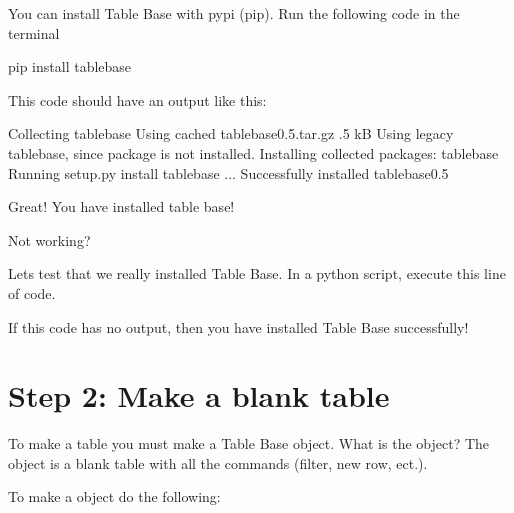 \documentclass[letterpaper,10pt,english]{sphinxmanual}
\begin{document}
You can install Table Base with pypi (pip). Run the following code in the
terminal

\begin{sphinxVerbatim}[commandchars=\\\{\}]
pip install tablebase
\end{sphinxVerbatim}

This code should have an output like this:

\begin{sphinxVerbatim}[commandchars=\\\{\}]
Collecting tablebase
  Using cached tablebase\PYGZhy{}0.5.tar.gz .5 kB
Using legacy   tablebase, since package  is not installed.
Installing collected packages: tablebase
    Running setup.py install  tablebase ... 
Successfully installed tablebase\PYGZhy{}0.5
\end{sphinxVerbatim}

Great! You have installed table base!

Not working? 

Lets test that we really installed Table Base. In a python script, execute
this line of code.

%
\begin{sphinxVerbatim}[commandchars=\\\{\}]
 
\end{sphinxVerbatim}
\sphinxresetverbatimhllines

If this code has no output, then you have installed Table Base successfully!



\section{Step 2: Make a blank table}
\label{\detokenize{basictutorial:step-2-make-a-blank-table}}
To make a table you must make a Table Base  object. What is the
 object? The  object is a blank table with all the
commands (filter, new row, ect.).

To make a  object do the following:
\end{document}
